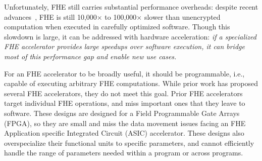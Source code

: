\figOverview

Unfortunately, FHE still carries substantial performance overheads:
despite recent advances~\cite{dathathri:pldi19:chet, dathathri:pldi20:eva, roy:hpca19:fpga-he, brutzkus:icml19:low, polyakov:17:palisade},
FHE is still 10,000$\times$ to 100,000$\times$ slower than unencrypted computation when executed in carefully optimized software.
Though this slowdown is large, it can be addressed with hardware acceleration:
\emph{if a specialized FHE accelerator provides large speedups over software execution,
it can bridge most of this performance gap and enable new use cases.}

For an FHE accelerator to be broadly useful, it should be programmable, i.e., capable of executing arbitrary FHE computations.
While prior work has proposed several FHE accelerators, they do not meet this goal.
Prior FHE accelerators~\cite{cousins:hpec14:fpga-he,cousins:tetc17:fpga-he,doroz:tc15:accelerating-fhe,roy:hpca19:fpga-he,riazi:asplos20:heax,turan:tc20:heaws} target individual FHE operations,
and miss important ones that they leave to software.
These designs are designed for a Field Programmable Gate Arrays (FPGA), so they are small and 
miss the data movement issues facing an FHE Application specific Integrated Circuit (ASIC) accelerator.
These designs also overspecialize their functional units to specific parameters,
and cannot efficiently handle the range of parameters needed within a program or across programs.
%

